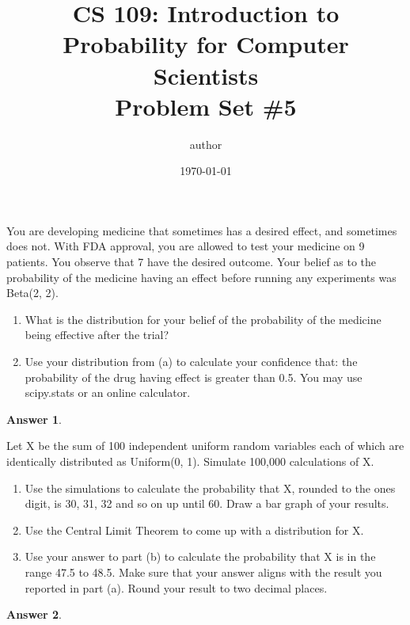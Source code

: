 \documentclass[12pt]{article}
\title{CS 109: Introduction to Probability for Computer Scientists\\Problem Set \#5}
\author{\Large{author}} %
\date{\Large{\today}} %
\renewcommand{\(}{\left(}
\renewcommand{\)}{\right)}
\theoremstyle{definition}
\newtheorem*{answer}{Answer}
\begin{document}
\maketitle
  
\begin{enumerate}
\large{
    \item You are developing medicine that sometimes has a desired effect, and sometimes does not. With FDA approval, you are allowed to test your medicine on 9 patients. You observe that 7 have the desired outcome. Your belief as to the probability of the medicine having an effect before running any experiments was Beta(2, 2).
    \begin{enumerate}
        \item What is the distribution for your belief of the probability of the medicine being effective after the trial?
        \item Use your distribution from (a) to calculate your confidence that: the probability of the drug having effect is greater than 0.5. You may use scipy.stats or an online calculator.
    \end{enumerate}
    
    \begin{shaded}
    \begin{answer}
    
    \end{answer}
    \end{shaded}
    \newpage
    
    \item \text{[Coding]} Let X be the sum of 100 independent uniform random variables each of which are identically distributed as Uniform(0, 1). Simulate 100,000 calculations of X.
    \begin{enumerate}
        \item Use the simulations to calculate the probability that X, rounded to the ones digit, is 30, 31, 32 and so on up until 60. Draw a bar graph of your results.
        \item Use the Central Limit Theorem to come up with a distribution for X.
        \item Use your answer to part (b) to calculate the probability that X is in the range 47.5 to 48.5. Make sure that your answer aligns with the result you reported in part (a). Round your result to two decimal places.
    \end{enumerate}
    
    \begin{shaded}
    \begin{answer}
    

\end{answer}
\end{shaded}}
\end{enumerate}
\end{document}
